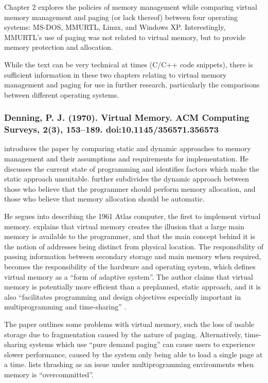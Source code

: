 Chapter 2 explores the policies of memory management while comparing virtual memory management and paging (or lack thereof) between four operating systems: MS-DOS, MMURTL, Linux, and Windows XP. Interestingly, MMURTL's use of paging was not related to virtual memory, but to provide memory protection and allocation.

While the text can be very technical at times (C/C++ code snippets), there is sufficient information in these two chapters relating to virtual memory management and paging for use in further research, particularly the comparisons between different operating systems.

\newpage

\subsubsection*{Denning, P. J. (1970). Virtual Memory. ACM Computing Surveys, 2(3), 153–189. doi:10.1145/356571.356573}

\citet{Denning1970} introduces the paper by comparing static and dynamic approaches to memory management and their assumptions and requirements for implementation. He discusses the current state of programming and identifies factors which make the static approach unsuitable. \citet{Denning1970} further subdivides the dynamic approach between those who believe that the programmer should perform memory allocation, and those who believe that memory allocation should be automatic.

He segues into describing the 1961 Atlas computer, the first to implement virtual memory. \citet{Denning1970} explains that virtual memory creates the illusion that a large main memory is available to the programmer, and that the main concept behind it is the notion of addresses being distinct from physical location. The responsibility of passing information between secondary storage and main memory when required, becomes the responsibility of the hardware and operating system, which defines virtual memory as a ``form of adaptive system''. The author claims that virtual memory is potentially more efficient than a preplanned, static approach, and it is also ``facilitates programming and design objectives especially important in multiprogramming and time-sharing'' \citep[p. 156]{Denning1970}.

The paper outlines some problems with virtual memory, such the loss of usable storage due to fragmentation caused by the nature of paging. Alternatively, time-sharing systems which use ``pure demand paging'' can cause users to experience slower performance, caused by the system only being able to load a single page at a time. \citet[p. 157]{Denning1970} lists thrashing as an issue under multiprogramming environments when memory is ``overcommitted''.

